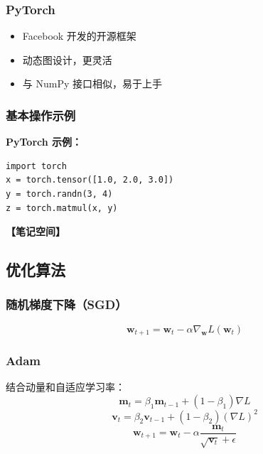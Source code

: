\documentclass[12pt,a4paper]{article}
\newcommand{\notespace}[1][3cm]{%
  \vspace{#1}%
  \noindent\textbf{【笔记空间】}%
  \vspace{#1}%
}
\newcommand{\1}{\mathbf{1}}
\begin{document}
\subsubsection*{PyTorch}

\begin{itemize}[leftmargin=2em]
  \item Facebook 开发的开源框架
  \item 动态图设计，更灵活
  \item 与 NumPy 接口相似，易于上手
\end{itemize}

\subsubsection*{基本操作示例}

\textbf{PyTorch 示例：}

\begin{verbatim}
import torch
x = torch.tensor([1.0, 2.0, 3.0])
y = torch.randn(3, 4)
z = torch.matmul(x, y)
\end{verbatim}

\notespace[2cm]

\subsection{优化算法}

\subsubsection*{随机梯度下降（SGD）}

\begin{equation}
\mathbf{w}_{t+1}=\mathbf{w}_t-\alpha\nabla_{\mathbf{w}}L(\mathbf{w}_t)
\end{equation}

\subsubsection*{Adam}

结合动量和自适应学习率：
\begin{equation}
\mathbf{m}_t=\beta_1\mathbf{m}_{t-1}+(1-\beta_1)\nabla L
\end{equation}
\begin{equation}
\mathbf{v}_t=\beta_2\mathbf{v}_{t-1}+(1-\beta_2)(\nabla L)^2
\end{equation}
\begin{equation}
\mathbf{w}_{t+1}=\mathbf{w}_t-\alpha\frac{\mathbf{m}_t}{\sqrt{\mathbf{v}_t}+\epsilon}
\end{equation}
\end{document}
